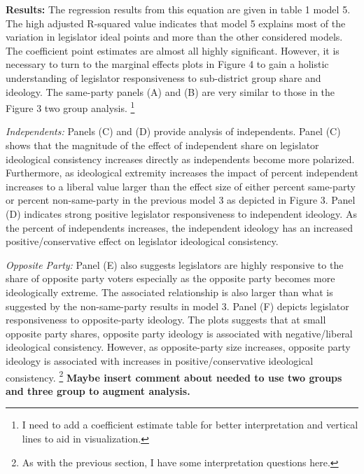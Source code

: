\documentclass[10pt,letterpaper]{article}
\begin{document}
\textbf{Results:} The regression results from this equation are given in table 1 model 5. The high adjusted R-squared value indicates that model 5 explains most of the variation in legislator ideal points and more than the other considered models. The coefficient point estimates are almost all highly significant. However, it is necessary to turn to the marginal effects plots in Figure 4 to gain a holistic understanding of legislator responsiveness to sub-district group share and ideology. The same-party panels (A) and (B) are very similar to those in the Figure 3 two group analysis. \footnote{I need to add a coefficient estimate table for better interpretation and vertical lines to aid in visualization.} 

\textit{Independents:} Panels (C) and (D) provide analysis of independents. Panel (C) shows that the magnitude of the effect of independent share on legislator ideological consistency increases directly as independents become more polarized. Furthermore, as ideological extremity increases the impact of percent independent increases to a liberal value larger than the effect size of either percent same-party or percent non-same-party in the previous model 3 as depicted in Figure 3. Panel (D) indicates strong positive legislator responsiveness to independent ideology. As the percent of independents increases, the independent ideology has an increased positive/conservative effect on legislator ideological consistency.


\textit{Opposite Party:} Panel (E) also suggests legislators are highly responsive to the share of opposite party voters especially as the opposite party becomes more ideologically extreme. The associated relationship is also larger than what is suggested by the non-same-party results in model 3. Panel (F) depicts legislator responsiveness to opposite-party ideology. The plots suggests that at small opposite party shares, opposite party ideology is associated with negative/liberal ideological consistency. However, as opposite-party size increases, opposite party ideology is associated with increases in positive/conservative ideological consistency. \footnote{As with the previous section, I have some interpretation questions here.} \textbf{Maybe insert comment about needed to use two groups and three group to augment analysis.}
\end{document}
